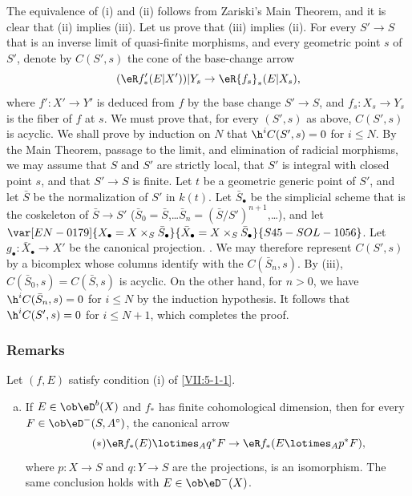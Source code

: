 The equivalence of (i) and (ii) follows from Zariski's Main Theorem, and it is
clear that (ii) implies (iii). Let us prove that (iii) implies (ii). For every
$S'\to S$ that is an inverse limit of quasi-finite morphisms, and every
geometric point $s$ of $S'$, denote by $C(S',s)$ the cone of the base-change
arrow
\[
  (\eR f'_\ast(E|X'))|Y_s \to \eR{f_s}_\ast (E|X_s) \text{,} 
\]
where $f':X'\to Y'$ is deduced from $f$ by the base change $S'\to S$, and
$f_s:X_s\to Y_s$ is the fiber of $f$ at $s$. We must prove that, for every
$(S',s)$ as above, $C(S',s)$ is acyclic. We shall prove by induction on $N$ that
$\h^i C(S',s) = 0$ for $i\leqslant N$. By the Main Theorem, passage to the
limit, and elimination of radicial morphisms, we may assume that $S$ and $S'$
are strictly local, that $S'$ is integral with closed point $s$, and that
$S'\to S$ is finite. Let $t$ be a geometric generic point of $S'$, and let
$\bar S$ be the normalization of $S'$ in $k(t)$. Let $\bar S_\bullet$ be the
simplicial scheme that is the coskeleton of $\bar S\to S'$
($\bar S_0=\bar S$,\ldots $\bar S_n=(\bar S/S')^{n+1}$,\ldots), and let
$\var[EN-0179]{X_\bullet=X\times_S \bar S_\bullet}{\bar X_\bullet=X\times_S \bar S_\bullet}{S45-SOL-1056}$. Let
$g_\bullet:\bar X_\bullet \to X'$ be the canonical projection. 
. We may therefore represent $C(S',s)$ by a bicomplex whose
columns identify with the $C(\bar S_n,s)$. By (iii),
$C(\bar S_0,s)=C(\bar S,s)$ is acyclic. On the other hand, for $n>0$, we have
$\h^i C(\bar S_n,s)=0$ for $i\leqslant N$ by the induction hypothesis. It
follows that $\h^i C(S',s)=0$ for $i\leqslant N+1$, which completes the proof.





\subsubsection{Remarks}\label{VII:5-1-2}

Let $(f,E)$ satisfy condition (i) of \ref{VII:5-1-1}.
\begin{enumerate}[a)]
  \item If $E\in \ob \eD^b(X)$ and $f_\ast$ has finite cohomological
    dimension, then for every $F\in \ob\eD^-(S,A^\circ)$, the canonical arrow
    \begin{equation*}\tag{$*$}\label{VII:eq:5-1-1-1}
      \eR f_\ast(E)\lotimes_A q^\ast F \to \eR f_\ast(E\lotimes_A p^\ast F) \text{,} 
    \end{equation*}
    where $p:X\to S$ and $q:Y\to S$ are the projections, is an isomorphism.
    The same conclusion holds with $E\in\ob\eD^-(X)$.
\end{enumerate} 

